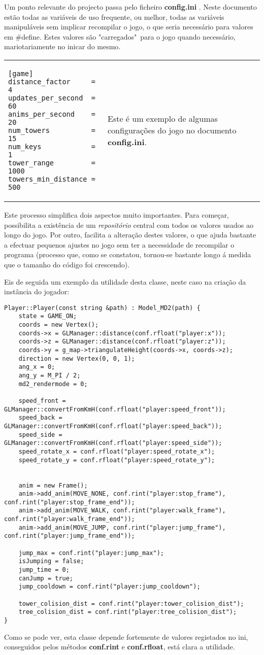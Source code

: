 

Um ponto relevante do projecto passa pelo ficheiro {\bf config.ini} . Neste documento estão todas as variáveis de uso frequente, ou melhor, todas as variáveis manipuláveis sem implicar recompilar o jogo, o que seria necessário para valores em \#define. Estes valores são "carregados"\ para o jogo quando necessário, mariotariamente no inicar do mesmo.

\-
\begin{center}
\begin{tabular} {l | p{10cm}}
\begin{lstlisting}
[game]
distance_factor		= 4
updates_per_second	= 60
anims_per_second	= 20
num_towers			= 15
num_keys			= 1
tower_range			= 1000
towers_min_distance = 500
\end{lstlisting} 
& 
Este é um exemplo de algumas configurações do jogo no documento {\bf config.ini}. \\
\end{tabular}
\end{center}

Este processo simplifica dois aspectos muito importantes. Para começar, possibilita a existência de um \emph{repositório} central com todos os valores usados ao longo do jogo. Por outro, facilita a alteração destes valores, o que ajuda bastante a efectuar pequenos ajustes no jogo sem ter a necessidade de recompilar o programa (processo que, como se constatou, tornou-se bastante longo á medida que o tamanho do código foi crescendo).

Eis de seguida um exemplo da utilidade desta classe, neste caso na criação da instância do jogador:

\begin{lstlisting}
Player::Player(const string &path) : Model_MD2(path) {
	state = GAME_ON;
	coords = new Vertex();
	coords->x = GLManager::distance(conf.rfloat("player:x"));
	coords->z = GLManager::distance(conf.rfloat("player:z"));
	coords->y = g_map->triangulateHeight(coords->x, coords->z);
	direction = new Vertex(0, 0, 1);
	ang_x = 0;
	ang_y = M_PI / 2;
	md2_rendermode = 0;

	speed_front = GLManager::convertFromKmH(conf.rfloat("player:speed_front"));
	speed_back = GLManager::convertFromKmH(conf.rfloat("player:speed_back"));
	speed_side = GLManager::convertFromKmH(conf.rfloat("player:speed_side"));
	speed_rotate_x = conf.rfloat("player:speed_rotate_x");
	speed_rotate_y = conf.rfloat("player:speed_rotate_y");


	anim = new Frame();
	anim->add_anim(MOVE_NONE, conf.rint("player:stop_frame"), conf.rint("player:stop_frame_end"));
	anim->add_anim(MOVE_WALK, conf.rint("player:walk_frame"), conf.rint("player:walk_frame_end"));
	anim->add_anim(MOVE_JUMP, conf.rint("player:jump_frame"), conf.rint("player:jump_frame_end"));

	jump_max = conf.rint("player:jump_max");
	isJumping = false;
	jump_time = 0;
	canJump = true;
	jump_cooldown = conf.rint("player:jump_cooldown");

	tower_colision_dist = conf.rint("player:tower_colision_dist");
	tree_colision_dist = conf.rint("player:tree_colision_dist");
}
\end{lstlisting}

Como se pode ver, esta classe depende fortemente de valores registados no ini, conseguidos pelos métodos \textbf{conf.rint} e \textbf{conf.rfloat}, está clara a utilidade.
